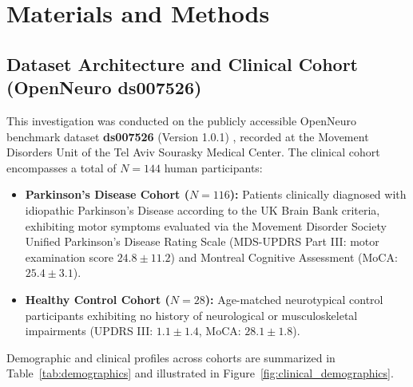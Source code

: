 \documentclass[review,12pt]{elsarticle}
\begin{document}
\section{Materials and Methods}
\label{sec:methods}

\subsection{Dataset Architecture and Clinical Cohort (OpenNeuro ds007526)}
\label{sec:dataset}
This investigation was conducted on the publicly accessible OpenNeuro benchmark dataset \textbf{ds007526} (Version 1.0.1) \cite{orban2024dataset}, recorded at the Movement Disorders Unit of the Tel Aviv Sourasky Medical Center. The clinical cohort encompasses a total of $N = 144$ human participants:
\begin{itemize}
    \item \textbf{Parkinson's Disease Cohort ($N = 116$):} Patients clinically diagnosed with idiopathic Parkinson's Disease according to the UK Brain Bank criteria, exhibiting motor symptoms evaluated via the Movement Disorder Society Unified Parkinson's Disease Rating Scale (MDS-UPDRS Part III: motor examination score $24.8 \pm 11.2$) and Montreal Cognitive Assessment (MoCA: $25.4 \pm 3.1$).
    \item \textbf{Healthy Control Cohort ($N = 28$):} Age-matched neurotypical control participants exhibiting no history of neurological or musculoskeletal impairments (UPDRS III: $1.1 \pm 1.4$, MoCA: $28.1 \pm 1.8$).
\end{itemize}

Demographic and clinical profiles across cohorts are summarized in Table~\ref{tab:demographics} and illustrated in Figure~\ref{fig:clinical_demographics}.

\begin{table}[htbp]
\centering
\caption{Clinical Demographic Characteristics of the Study Cohort ($N = 144$)}
\label{tab:demographics}
\vspace{0.4em}
\end{table}
\end{document}

